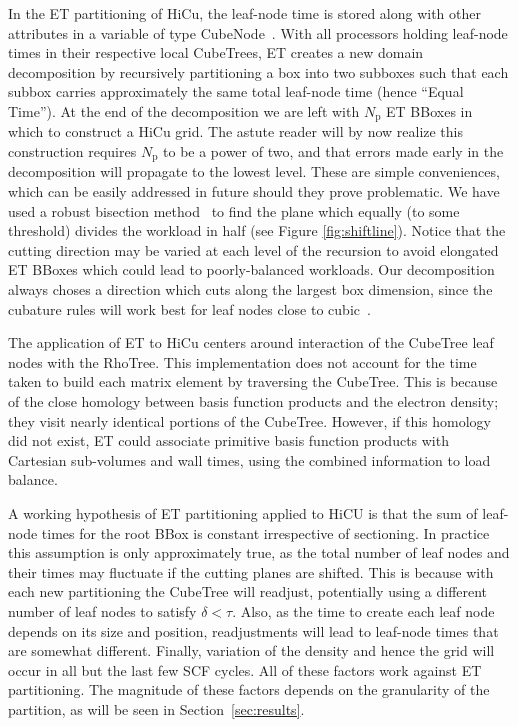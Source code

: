 \commentoutA{\documentclass[prl,aps,twocolumn,showpacs,twocolumngrid,superbib]{revtex4}}
\newcommand{\Np}{N_{\mathrm{p}}} \newcommand{\Nbox}{N_{\mathrm{b}}}
\begin{document}
In the ET partitioning of HiCu, the leaf-node time is stored along with other
attributes in a variable of type CubeNode~\cite{MChallacombe00A}.
With all processors holding leaf-node times in their respective local
CubeTrees, ET creates a new domain decomposition by recursively
partitioning a box into two subboxes such that each subbox carries
approximately the same total leaf-node time (hence ``Equal Time'').
At the end of the decomposition we are left with $\Np$ ET BBoxes in
which to construct a HiCu grid.  The astute reader will by now realize
this construction requires $\Np$ to be a power of two, and that errors
made early in the decomposition will propagate to the lowest level.
These are simple conveniences, which can be easily addressed in future
should they prove problematic.  We have used a robust bisection
method~\cite{WPress92} to find the plane which equally (to some
threshold) divides the workload in half (see Figure
\ref{fig:shiftline}). Notice that the cutting direction may be varied
at each level of the recursion to avoid elongated ET BBoxes which
could lead to poorly-balanced workloads. Our decomposition always
choses a direction which cuts along the largest box dimension, since
the cubature rules will work best for leaf nodes close to cubic~\cite{Stroud71}.

The application of ET to HiCu centers around interaction of the 
CubeTree leaf nodes with the RhoTree.  This implementation does not account
for the time taken to build each matrix element by traversing the CubeTree.
This is because of the close homology between basis function products
and the electron density; they visit nearly identical portions of the
CubeTree.  However, if this homology did not exist, ET  could
associate primitive basis function products with Cartesian sub-volumes 
and wall times, using the combined information to load balance.

A working hypothesis of ET partitioning applied to HiCU is that the sum of 
leaf-node times for the root BBox is constant irrespective of sectioning.  In
practice this assumption is only approximately true, as the total number of leaf nodes and
their times may fluctuate if the cutting planes are shifted. This is 
because with each new partitioning the CubeTree will
readjust, potentially using a different number of leaf nodes to satisfy
$\delta<\tau$.  Also, as the time to create each leaf node depends on
its size and position, readjustments will lead to leaf-node times that
are somewhat different. Finally, variation of the density and hence
the grid will occur in all but the last few SCF cycles.  All of these
factors work against ET partitioning.  The magnitude of these factors
depends on the granularity of the partition, as will be seen in 
Section~\ref{sec:results}.
\end{document}
